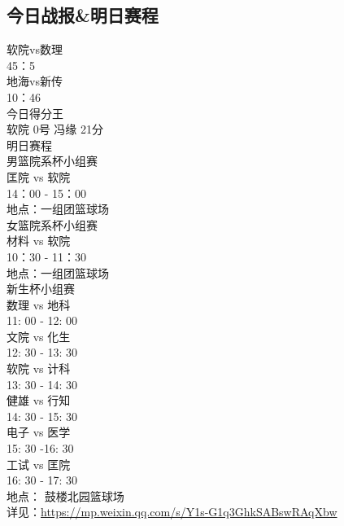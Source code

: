 \documentclass[letterpaper, 12pt]{article}
\begin{document}
\begin{multicols}{2}
\subsection{今日战报\&明日赛程}
软院vs数理
\\45：5
\\地海vs新传
\\10：46
\\今日得分王
\\软院  0号 冯缘  21分
\\明日赛程
\\男篮院系杯小组赛
\\匡院 vs 软院
\\ 14：00 - 15：00
\\地点：一组团篮球场
\\女篮院系杯小组赛
\\材料 vs 软院 
\\10：30 - 11：30
\\地点：一组团篮球场
\\新生杯小组赛
\\数理 vs 地科
\\11: 00 - 12: 00
\\文院 vs 化生
\\12: 30 - 13: 30
\\软院 vs 计科
\\13: 30 - 14: 30
\\健雄 vs 行知
\\14: 30 - 15: 30
\\电子 vs 医学
\\15: 30 -16: 30
\\工试 vs 匡院
\\16: 30 - 17: 30
\\地点： 鼓楼北园篮球场
\\详见：\url{https://mp.weixin.qq.com/s/Y1s-G1q3GhkSABswRAqXbw}



\end{multicols}
\end{document}
